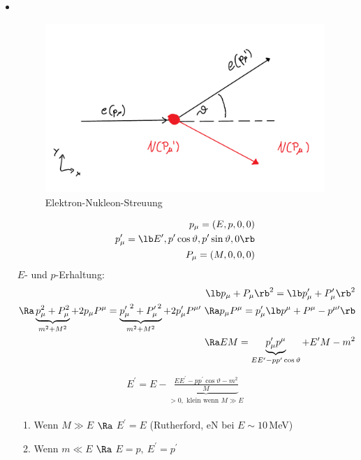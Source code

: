 \begin{itemize}
\item {}\\
\begin{figure}[!ht]\centering
\includegraphics[width=.6\textwidth]{imgs/ep5-fig-6-1.pdf}
\caption{Elektron-Nukleon-Streuung \label{fig:6.1}}
\end{figure}
\begin{align}
\begin{split}
p_\mu = (E,p,0,0)\\
p_\mu^\prime = \lb E^\prime, p^\prime \cos \vartheta,  p^\prime \sin \vartheta,0 \rb \\
P_\mu = (M,0,0,0)
\end{split}
\end{align}
$E$- und $p$-Erhaltung:
\begin{align}
\begin{split}
\lb  p_\mu + P_\mu\rb ^2 = \lb p_\mu^\prime + P_\mu^\prime\rb ^2\\
\Ra \underbrace{p_\mu^2 + P_\mu^2 }_{m^2+M^2} + 2p_\mu P^\mu = \underbrace{{p_\mu^\prime}^2 + {P_\mu^\prime}^2}_{m^2+M^2} + 2p_\mu^\prime P^{\mu\prime}\
\Ra p_\mu P^\mu = p_\mu^\prime \lb  p^\mu + P^\mu - p^{\mu\prime}\rb \\
\Ra EM = \underbrace{p_\mu^\prime p^\mu}_{EE^\prime - pp^\prime \cos \vartheta} + E^\prime M - m^2
\end{split}
\end{align}
\begin{align}
\begin{split}
\boxed{E^\prime = E - \underbrace{\frac{EE^\prime - pp^\prime \cos \vartheta - m^2}{M}}_{>0, \text{ klein wenn } M\gg E}}
\end{split}
\end{align}
\begin{enumerate}
\item Wenn $M\gg E$ $\Ra$ $E^\prime = E$ (Rutherford, eN bei $E\sim 10$\,MeV)
\item Wenn $m\ll E$ $\Ra$ $E=p,\ E^\prime = p^\prime$

\end{enumerate}
\end{itemize}
